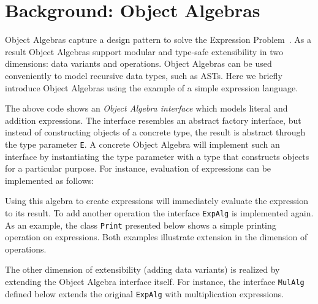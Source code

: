 \section{Background: Object Algebras}\label{subsec:ObjectAlgebras}

Object Algebras capture a design pattern to solve the Expression
Problem~\cite{wadler98expression-problem}.  As a result Object
Algebras support modular and type-safe extensibility in two
dimensions: data variants and operations. Object Algebras can be used
conveniently to model recursive data types, such as ASTs. Here we
briefly introduce Object Algebras using the example of a simple
expression language.


The above code shows an \emph{Object Algebra interface} which models
literal and addition expressions. The interface resembles an abstract
factory interface, but instead of constructing objects of a concrete
type, the result is abstract through the type parameter \lstinline{E}.
A concrete Object Algebra will implement such an interface by
instantiating the type parameter with a type that constructs objects
for a particular purpose. For instance, evaluation of expressions can be implemented as follows:


Using this algebra to create expressions will immediately evaluate
the expression to its result. To add another operation the interface
\lstinline{ExpAlg} is implemented again. As an example, the class
\lstinline{Print} presented below shows a simple printing operation on
expressions. Both examples illustrate extension in the dimension of
operations.



The other dimension of extensibility (adding data variants) is
realized by extending the Object Algebra interface itself. For
instance, the interface \lstinline{MulAlg} defined below extends the
original \lstinline{ExpAlg} with multiplication expressions.

